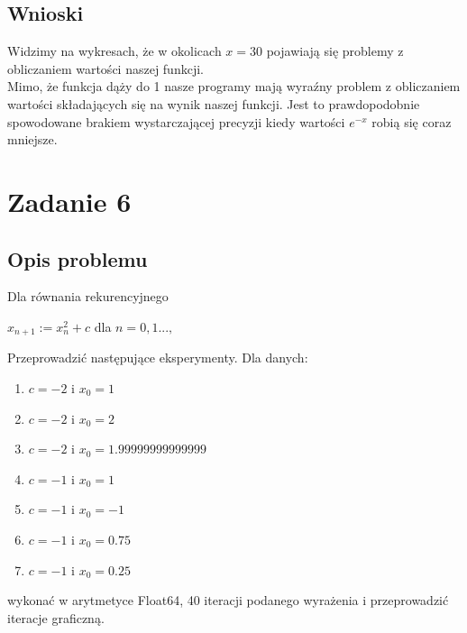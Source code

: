 \documentclass{article}
\begin{document}
\subsection*{Wnioski}
	Widzimy na wykresach, że w okolicach $x = 30$ pojawiają się problemy z obliczaniem wartości naszej funkcji. \\
	Mimo, że funkcja dąży do 1 nasze programy mają wyraźny problem z obliczaniem wartości składających się na wynik naszej funkcji.
	Jest to prawdopodobnie spowodowane brakiem wystarczającej precyzji kiedy wartości $e^{-x}$ robią się coraz mniejsze.


\section*{Zadanie 6}
\subsection*{Opis problemu}
	Dla równania rekurencyjnego \\
	\centerline{$x_{n+1} := x_n^2 + c$ dla $n = 0, 1...,$ \\}
	Przeprowadzić następujące eksperymenty. Dla danych:
	\begin{enumerate}
        \item $c = -2$ i $x_0 = 1$
        \item $c = -2$ i $x_0 = 2$
        \item $c = -2$ i $x_0 = 1.99999999999999$
        \item $c = -1$ i $x_0 = 1$
        \item $c = -1$ i $x_0 = -1$
        \item $c = -1$ i $x_0 = 0.75$
        \item $c = -1$ i $x_0 = 0.25$
    \end{enumerate}
    wykonać w arytmetyce Float64, 40 iteracji podanego wyrażenia i przeprowadzić iteracje graficzną.
\end{document}
